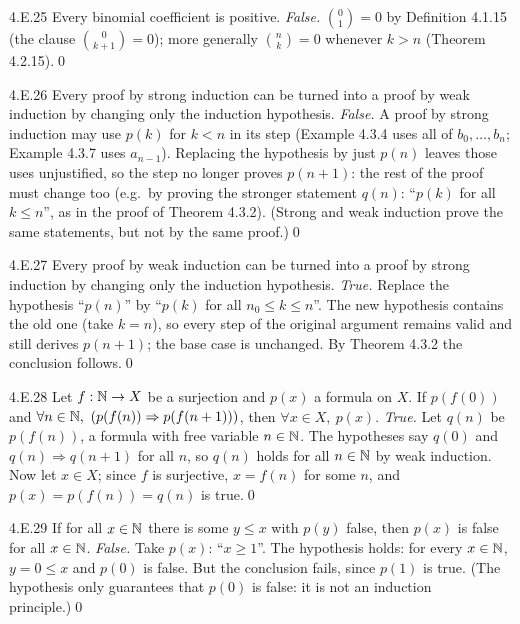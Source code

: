\begin{bookex}[essential]{4.E.25}
Every binomial coefficient is positive.
\solution
\emph{False.} $\binom01=0$ by Definition 4.1.15 (the clause $\binom0{k+1}=0$); more generally $\binom nk=0$ whenever $k>n$ (Theorem 4.2.15).\qed
\end{bookex}

\begin{bookex}[essential]{4.E.26}
Every proof by strong induction can be turned into a proof by weak induction by changing only the induction hypothesis.
\solution
\emph{False.} A proof by strong induction may use $p(k)$ for $k<n$ in its step (Example 4.3.4 uses all of $b_0,\dots,b_n$; Example 4.3.7 uses $a_{n-1}$). Replacing the hypothesis by just $p(n)$ leaves those uses unjustified, so the step no longer proves $p(n+1)$: the rest of the proof must change too (e.g.\ by proving the stronger statement $q(n)$: ``$p(k)$ for all $k\le n$'', as in the proof of Theorem 4.3.2). (Strong and weak induction prove the same statements, but not by the same proof.)\qed
\end{bookex}

\begin{bookex}[essential]{4.E.27}
Every proof by weak induction can be turned into a proof by strong induction by changing only the induction hypothesis.
\solution
\emph{True.} Replace the hypothesis ``$p(n)$'' by ``$p(k)$ for all $n_0\le k\le n$''. The new hypothesis contains the old one (take $k=n$), so every step of the original argument remains valid and still derives $p(n+1)$; the base case is unchanged. By Theorem 4.3.2 the conclusion follows.\qed
\end{bookex}

\begin{bookex}[recommended]{4.E.28}
Let $f:\mathbb{N}\to X$ be a surjection and $p(x)$ a formula on $X$. If $p(f(0))$ and $\forall n\in\mathbb{N},\ (p(f(n))\Rightarrow p(f(n+1)))$, then $\forall x\in X,\ p(x)$.
\solution
\emph{True.} Let $q(n)$ be $p(f(n))$, a formula with free variable $n\in\mathbb{N}$. The hypotheses say $q(0)$ and $q(n)\Rightarrow q(n+1)$ for all $n$, so $q(n)$ holds for all $n\in\mathbb{N}$ by weak induction. Now let $x\in X$; since $f$ is surjective, $x=f(n)$ for some $n$, and $p(x)=p(f(n))=q(n)$ is true.\qed
\end{bookex}

\begin{bookex}[essential]{4.E.29}
If for all $x\in\mathbb{N}$ there is some $y\le x$ with $p(y)$ false, then $p(x)$ is false for all $x\in\mathbb{N}$.
\solution
\emph{False.} Take $p(x)$: ``$x\ge1$''. The hypothesis holds: for every $x\in\mathbb{N}$, $y=0\le x$ and $p(0)$ is false. But the conclusion fails, since $p(1)$ is true. (The hypothesis only guarantees that $p(0)$ is false: it is not an induction principle.)\qed
\end{bookex}


